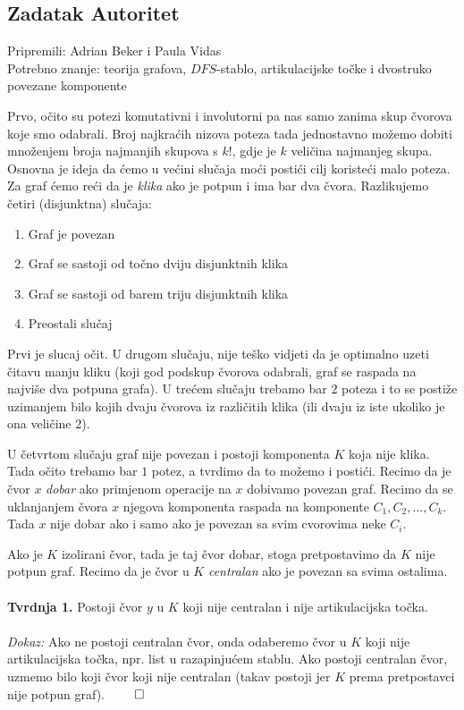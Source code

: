 \subsection*{Zadatak Autoritet}
\textsf{Pripremili: Adrian Beker i Paula Vidas}\\
\textsf{Potrebno znanje: teorija grafova, $DFS$-stablo, artikulacijske točke i dvostruko povezane komponente}

Prvo, očito su potezi komutativni i involutorni pa nas samo zanima skup čvorova
koje smo odabrali. Broj najkraćih nizova poteza tada jednostavno možemo dobiti
množenjem broja najmanjih skupova s $k!$, gdje je $k$ veličina najmanjeg skupa.
Osnovna je ideja da ćemo u većini slučaja moći postići cilj koristeći malo
poteza. Za graf ćemo reći da je \textit{klika} ako je potpun i ima bar dva čvora. Razlikujemo četiri (disjunktna) slučaja:

\begin{enumerate}
    \item Graf je povezan
    \item Graf se sastoji od točno dviju disjunktnih klika
    \item Graf se sastoji od barem triju disjunktnih klika
    \item Preostali slučaj
\end{enumerate}
Prvi je slucaj očit. U drugom slučaju, nije teško vidjeti da je optimalno uzeti čitavu manju kliku (koji god podskup čvorova odabrali, graf se raspada na najviše dva potpuna grafa).
U trećem slučaju trebamo bar $2$ poteza i to se postiže uzimanjem bilo kojih dvaju čvorova iz različitih klika (ili dvaju iz iste ukoliko je ona veličine $2$).

U četvrtom slučaju graf nije povezan i postoji komponenta $K$ koja nije klika. Tada očito trebamo bar $1$ potez, a tvrdimo da to možemo i postići. Recimo da je čvor $x$ \textit{dobar} ako primjenom operacije na $x$ dobivamo povezan graf. Recimo da se uklanjanjem čvora $x$ njegova komponenta raspada na komponente $C_1, C_2, …, C_k$. Tada $x$ nije dobar ako i samo ako je povezan sa svim cvorovima neke $C_i$.

Ako je $K$ izolirani čvor, tada je taj čvor dobar, stoga pretpostavimo da $K$ nije potpun graf. Recimo da je čvor u $K$ \textit{centralan} ako je povezan sa svima ostalima.
\\\\
\textbf{Tvrdnja 1.} Postoji čvor $y$ u $K$ koji nije centralan i nije artikulacijska točka.
\\\\
\textit{Dokaz:} Ako ne postoji centralan čvor, onda odaberemo čvor u $K$ koji nije artikulacijska točka, npr. list u razapinjućem stablu. Ako postoji centralan čvor, uzmemo bilo koji čvor koji nije centralan (takav postoji jer $K$ prema pretpostavci nije potpun graf). $\qed$

